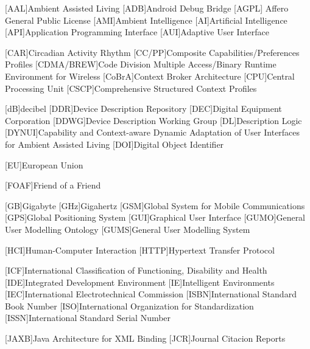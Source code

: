 \begin{acronym}[dynui]
  [AAL]{Ambient Assisted Living}
  [ADB]{Android Debug Bridge}
  [AGPL] {Affero General Public License}
  [AMI]{Ambient Intelligence} %
  [AI]{Artificial Intelligence}
  [API]{Application Programming Interface}
  [AUI]{Adaptive User Interface}
  
  [CAR]{Circadian Activity Rhythm}
  [CC/PP]{Composite Capabilities/Preferences Profiles}
  [CDMA/BREW]{Code Division Multiple Access/Binary Runtime Environment for Wireless}
  [CoBrA]{Context Broker Architecture}
  [CPU]{Central Processing Unit}
  [CSCP]{Comprehensive Structured Context Profiles}
  
  [dB]{decibel}
  [DDR]{Device Description Repository}
  [DEC]{Digital Equipment Corporation}
  [DDWG]{Device Description Working Group}
  [DL]{Description Logic}
  [DYNUI]{Capability and Context-aware Dynamic Adaptation of User Interfaces for Ambient Assisted Living}
  [DOI]{Digital Object Identifier}
  
  [EU]{European Union}
  
  [FOAF]{Friend of a Friend}
  
  [GB]{Gigabyte}
  [GHz]{Gigahertz}
  [GSM]{Global System for Mobile Communications}
  [GPS]{Global Positioning System}
  [GUI]{Graphical User Interface}
  [GUMO]{General User Modelling Ontology}
  [GUMS]{General User Modelling System}
  
  [HCI]{Human-Computer Interaction}
  [HTTP]{Hypertext Transfer Protocol}
  
  [ICF]{International Classification of Functioning, Disability and Health}
  [IDE]{Integrated Development Environment}
  [IE]{Intelligent Environments}
  [IEC]{International Electrotechnical Commission}
  [ISBN]{International Standard Book Number}
  [ISO]{International Organization for Standardization}
  [ISSN]{International Standard Serial Number}
  
  [JAXB]{Java Architecture for XML Binding}
  [JCR]{Journal Citacion Reports}
  

\end{acronym}
